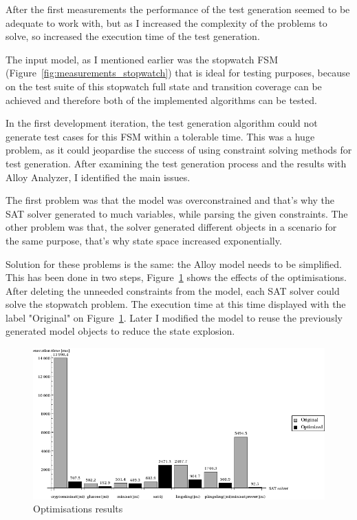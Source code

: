 After the first measurements the performance of the test generation seemed to be adequate to work with, but as I increased the complexity of the problems to solve, so increased the execution time of the test generation. 

The input model, as I mentioned earlier was the stopwatch FSM (Figure~\ref{fig:measurements_stopwatch}) that is ideal for testing purposes, because on the test suite of this stopwatch full state and transition coverage can be achieved and therefore both of the implemented algorithms can be tested.

In the first development iteration, the test generation algorithm could not generate test cases for this FSM within a tolerable time. This was a huge problem, as it could jeopardise the success of using constraint solving methods for test generation. After examining the test generation process and the results with Alloy Analyzer, I identified the main issues.

The first problem was that the model was overconstrained and that's why the SAT solver generated to much variables, while parsing the given constraints. The other problem was that, the solver generated different objects in a scenario for the same purpose, that's why state space increased exponentially.

Solution for these problems is the same: the Alloy model needs to be simplified. This has been done in two steps,  Figure~\ref{fig:measurements_optimalizations} shows the effects of the optimisations. After deleting the unneeded constraints from the model, each SAT solver could solve the stopwatch problem. The execution time at this time displayed with the label "Original" on Figure~\ref{fig:measurements_optimalizations}. Later I modified the model to reuse the previously generated model objects to reduce the state explosion.

\begin{figure}[htp]
\centering
\includegraphics[scale=0.55]{figures/measurements_optimalizations}
\caption{Optimisations results}
\label{fig:measurements_optimalizations}
\end{figure}

